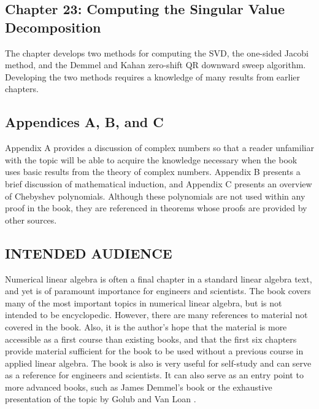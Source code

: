 \documentclass[../main.tex]{subfiles}
\begin{document}
\subsection*{Chapter 23: Computing the Singular Value Decomposition}
The chapter develops two methods for computing the SVD, the one-sided Jacobi method, and the Demmel and Kahan zero-shift QR downward sweep algorithm. Developing the two methods requires a knowledge of many results from earlier chapters.

\subsection*{Appendices A, B, and C}
Appendix A provides a discussion of complex numbers so that a reader unfamiliar with the topic will be able to acquire the knowledge necessary when the book uses basic results from the theory of complex numbers. Appendix B presents a brief discussion of mathematical induction, and Appendix C presents an overview of Chebyshev polynomials. Although these polynomials are not used within any proof in the book, they are referenced in theorems whose proofs are provided by other
sources.

\subsection*{INTENDED AUDIENCE}
Numerical linear algebra is often a final chapter in a standard linear algebra text, and yet is of paramount importance for engineers and scientists. The book covers many of the most important topics in numerical linear algebra, but is not intended to be encyclopedic. However, there are many references to material not covered in the book. Also, it is the author’s hope that the material is more accessible as a first course than existing books, and that the first six chapters provide material sufficient for the book to be used without a previous course in applied linear algebra. The book is also is very useful for self-study and can serve as a reference for engineers and scientists. It can also serve as an entry point to more advanced books, such as James Demmel’s book \cite{ref1}  or the exhaustive presentation of the topic by Golub and Van Loan \cite{ref2} .
\end{document}
